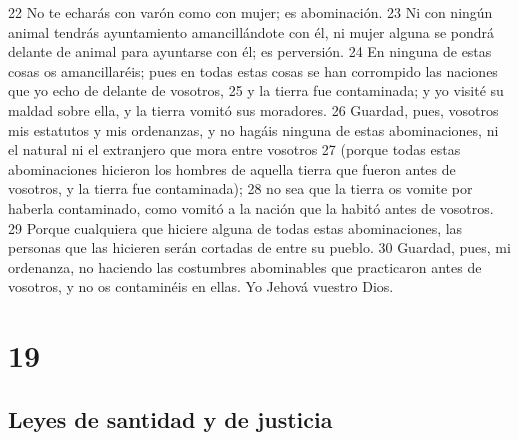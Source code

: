 22 No te echarás con varón como con mujer; es abominación.
23 Ni con ningún animal tendrás ayuntamiento amancillándote con él, ni mujer alguna se pondrá delante de animal para ayuntarse con él; es perversión.
24 En ninguna de estas cosas os amancillaréis; pues en todas estas cosas se han corrompido las naciones que yo echo de delante de vosotros,
25 y la tierra fue contaminada; y yo visité su maldad sobre ella, y la tierra vomitó sus moradores.
26 Guardad, pues, vosotros mis estatutos y mis ordenanzas, y no hagáis ninguna de estas abominaciones, ni el natural ni el extranjero que mora entre vosotros
27 (porque todas estas abominaciones hicieron los hombres de aquella tierra que fueron antes de vosotros, y la tierra fue contaminada);
28 no sea que la tierra os vomite por haberla contaminado, como vomitó a la nación que la habitó antes de vosotros.
29 Porque cualquiera que hiciere alguna de todas estas abominaciones, las personas que las hicieren serán cortadas de entre su pueblo.
30 Guardad, pues, mi ordenanza, no haciendo las costumbres abominables que practicaron antes de vosotros, y no os contaminéis en ellas. Yo Jehová vuestro Dios.

\chapter{19}

\section*{Leyes de santidad y de justicia}

